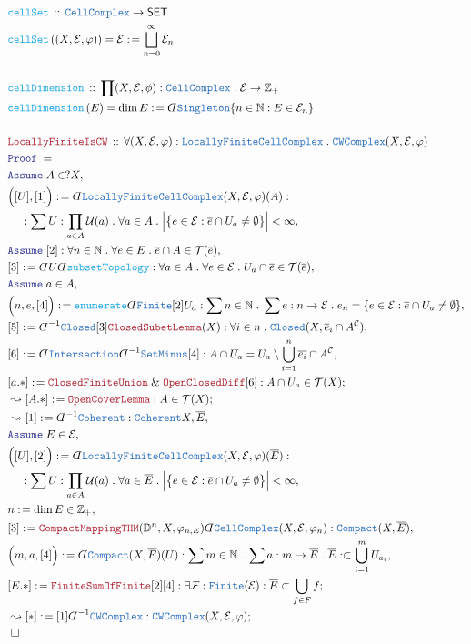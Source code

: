 \documentclass[12pt]{scrartcl}
\newcommand{\TYPE}[1]{\textcolor{NavyBlue}{\mathtt{#1}}}
\newcommand{\FUNC}[1]{\textcolor{Cerulean}{\mathtt{#1}}}
\newcommand{\LOGIC}[1]{\textcolor{Blue}{\mathtt{#1}}}
\newcommand{\THM}[1]{\textcolor{Maroon}{\mathtt{#1}}}
\renewcommand{\.}{\; . \;}
\newcommand{\de}{: \kern 0.1pc =}
\newcommand{\Act}[1]{\left( #1 \right)}
\newcommand{\Theorem}[2]{& \THM{#1} \, :: \, #2 \\ & \Proof = \\ }
\newcommand{\DeclareFunc}[2]{& \FUNC{#1} \, :: \, #2 \\}
\newcommand{\DefineNamedFunc}[4]{&  \FUNC{#1}\Act{#2} = #3 \de #4 \\}
\newcommand{\NewLine}{\\ & \kern 1pc}
\newcommand{\Page}[1]{ \begin{align*} #1 \end{align*}   }
\newcommand{ \bd }{ \ByDef }
\renewcommand{\And}{\; \& \;}
\newcommand{\Int}{\mathbb{Z} }
\newcommand{\Nat}{\mathbb{N} }
\newcommand{\Say}[3]{& #1 \de #2 : #3, \\}
\newcommand{\SayIn}[3]{& #1 \de #2 \in #3, \\}
\newcommand{\Conclude}[3]{& #1 \de #2 : #3; \\}
\newcommand{\Derive}[3]{& \leadsto #1 \de #2 : #3, \\}
\newcommand{\DeriveConclude}[3]{& \leadsto #1 \de #2 : #3 ; \\}
\newcommand{\Assume}[2]{& \LOGIC{Assume} \; #1 : #2, \\}
\newcommand{\AssumeIn}[2]{& \LOGIC{Assume} \; #1 \in #2, \\}
\newcommand{\QED}{\; \square}
\newcommand{\EndProof}{& \QED \\}
\newcommand{\ByDef}{\rotatebox[origin=c]{-180}{$D$}}%
\newcommand{\Proof}{\LOGIC{Proof} \; }
\newcommand{\C}{\mathcal{C}}
\newcommand{\SET}{\mathsf{SET}}
\newcommand{\T}{\mathcal{T}}
\newcommand{\U}{\mathcal{U}}
\newcommand{\F}{\mathcal{F}}
\newcommand{\E}{\mathcal{E}}
\begin{document}
\Page{
	\DeclareFunc{cellSet}{\TYPE{CellComplex} \to \SET}
	\DefineNamedFunc{cellSet}{(X,\E,\varphi)}{\E}{\bigsqcup^\infty_{n=0} \E_n}
	\\
	\DeclareFunc{cellDimension}
	{
		\prod (X,\E,\phi): \TYPE{CellComplex} \. \E \to \Int_+
	}
	\DefineNamedFunc{cellDimension}{E}{\dim E}{ \bd \TYPE{Singleton}\{ n \in \Nat : E \in \E_n \} }
	\\
	\Theorem{LocallyFiniteIsCW}{
		\forall (X,\E,\varphi) : \TYPE{LocallyFiniteCellComplex} \.
		\TYPE{CWComplex}(X,\E,\varphi)
	}
	\AssumeIn{A}{?X}
	\Say{\Big([U],[1] \Big)}{\bd \TYPE{LocallyFiniteCellComplex}(X,\E,\varphi)(A)}
	{
		\NewLine : 
		\sum U : \prod_{a \in A} \U(a) \.
		\forall a \in A \.
		\Big| \big\{ e \in \E : \overline{e} \cap U_a \neq \emptyset \big\} \Big| < \infty
	}
	\Assume{[2]}{\forall n \in \Nat \. \forall e \in E \. \overline{e} \cap A \in \T(\overline{e}) }
	\Say{[3]}{\bd U \bd \FUNC{subsetTopology}}{ 
		\forall a \in A \. 
		\forall e \in \E \.  
		U_a \cap \overline{e} \in \T(\overline{e})   }
	\AssumeIn{a}{A}
	\Say{\Big(n,e,[4]\Big)}{
		\FUNC{enumerate} \bd \TYPE{Finite} [2] U_a
	}
	{
		\sum n \in \Nat \.  \sum e : n \to \E \.
		e_n =  \{ e \in \E : \overline{e} \cap U_a \neq \emptyset   \}
	}
	\Say{[5]}{\bd^{-1} \TYPE{Closed}[3]\THM{ClosedSubetLemma}(X)}
	{
		\forall i \in n \. 
		\TYPE{Closed}(X,\overline{e}_i \cap A^\C) 
	}
	\Say{[6]}{\bd \TYPE{Intersection} \bd^{-1} \TYPE{SetMinus}[4]}{A \cap U_a = U_a \setminus \bigcup^n_{i=1} \overline{e_i} \cap A^\C  }
	\Conclude{[a.*]}{\THM{ClosedFiniteUnion} \And \THM{OpenClosedDiff}[6]}{ A \cap U_a \in \T(X)}
	\DeriveConclude{[A.*]}{\THM{OpenCoverLemma}}{A \in \T(X)}
	\Derive{[1]}{\bd^{-1} \TYPE{Coherent}}{\TYPE{Coherent}{X,\overline{E}}}
	\AssumeIn{E}{\E}
	\Say{\Big([U],[2] \Big)}{\bd \TYPE{LocallyFiniteCellComplex}(X,\E,\varphi)(\overline{E})}
	{
		\NewLine : 
		\sum U : \prod_{a \in A} \U(a) \.
		\forall a \in \overline{E} \.
		\Big| \big\{ e \in \E : \overline{e} \cap U_a \neq \emptyset \big\} \Big| < \infty
	}
	\SayIn{n}{\dim E}{\Int_+}
	\Say{[3]}{\THM{CompactMappingTHM}(\mathbb{D}^n,X,\varphi_{n,E})\bd \TYPE{CellComplex}(X,\E,\varphi_n)}
	{
		\TYPE{Compact}(X,\overline{E})
	}
	\Say{\Big(m,a,[4]\Big)}{\bd \TYPE{Compact}(X,\overline{E})(U)}
	{
		\sum m \in \Nat \. \sum a : m \to \overline{E} \. \overline{E} : \subset \bigcup^m_{i=1} U_{a_i}
	}
	\Conclude{[E.*]}{\THM{FiniteSumOfFinite}[2][4]}{\exists \F : \TYPE{Finite}(\E) : \overline{E} \subset \bigcup_{f \in F} f }
	\DeriveConclude{[*]}{[1]\bd^{-1} \TYPE{CWComplex}}{\TYPE{CWComplex}(X,\E,\varphi)}
	\EndProof
	\\
}
\end{document}
